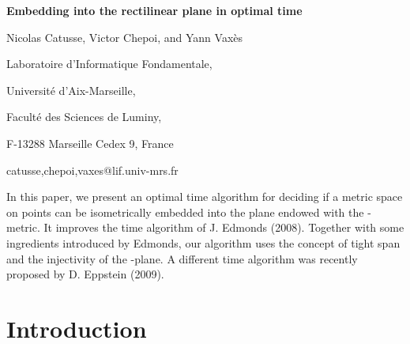 \documentclass[11pt]{amsart}
\begin{document}
\thispagestyle{empty}

	\centerline{\Large\bf Embedding into the rectilinear plane in optimal  time}

	\vspace{6mm}

	\centerline{{\sc Nicolas Catusse, Victor Chepoi,} and {\sc Yann Vax\`es}}

	\vspace{3mm}
	\medskip
	\centerline{Laboratoire d'Informatique Fondamentale,}
	\centerline{Universit\'e d'Aix-Marseille,}
	\centerline{Facult\'e des Sciences de Luminy,} \centerline{F-13288
	Marseille Cedex 9, France} \centerline{catusse,chepoi,vaxes@lif.univ-mrs.fr}

	\vspace{15mm}
	\begin{footnotesize} 
 In this paper, we present
an optimal  time algorithm for deciding if a metric space
 on  points can be isometrically embedded into the plane
endowed with the -metric. It improves the
 time algorithm of J. Edmonds (2008). Together with
some ingredients introduced by Edmonds, our algorithm uses the
concept of tight span and the injectivity of the -plane. A
different  time algorithm was recently proposed by D.
Eppstein (2009).
\end{footnotesize}


\section{Introduction}
\end{document}
